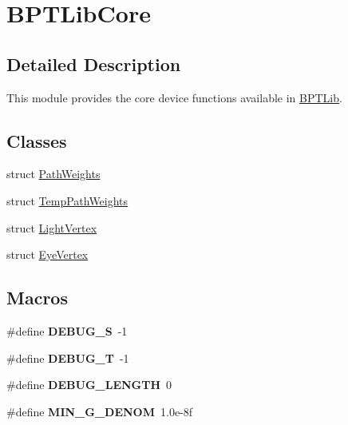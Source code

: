 \hypertarget{group___b_p_t_lib_core}{}\section{B\+P\+T\+Lib\+Core}
\label{group___b_p_t_lib_core}


\subsection{Detailed Description}
This module provides the core device functions available in \hyperlink{_b_p_t_lib_page}{B\+P\+T\+Lib}. \subsection*{Classes}
\begin{DoxyCompactItemize}
\item 
struct \hyperlink{struct_path_weights}{Path\+Weights}
\item 
struct \hyperlink{struct_temp_path_weights}{Temp\+Path\+Weights}
\item 
struct \hyperlink{struct_light_vertex}{Light\+Vertex}
\item 
struct \hyperlink{struct_eye_vertex}{Eye\+Vertex}
\end{DoxyCompactItemize}
\subsection*{Macros}
\begin{DoxyCompactItemize}
\item 
\mbox{\label{group___b_p_t_lib_core_gad52999b8f0e6bcdcb8eff92c83a9a6d0}} 
\#define {\bfseries D\+E\+B\+U\+G\+\_\+S}~-\/1
\item 
\mbox{\label{group___b_p_t_lib_core_ga5d82fcdd390b5b6830570f45ed38d6fe}} 
\#define {\bfseries D\+E\+B\+U\+G\+\_\+T}~-\/1
\item 
\mbox{\label{group___b_p_t_lib_core_gae9f1ff1c13ba5d59483b6fe60d6ed7f0}} 
\#define {\bfseries D\+E\+B\+U\+G\+\_\+\+L\+E\+N\+G\+TH}~0
\item 
\mbox{\label{group___b_p_t_lib_core_ga994bb2c2098e2755000049c79e0534f6}} 
\#define {\bfseries M\+I\+N\+\_\+\+G\+\_\+\+D\+E\+N\+OM}~1.\+0e-\/8f
\end{DoxyCompactItemize}
